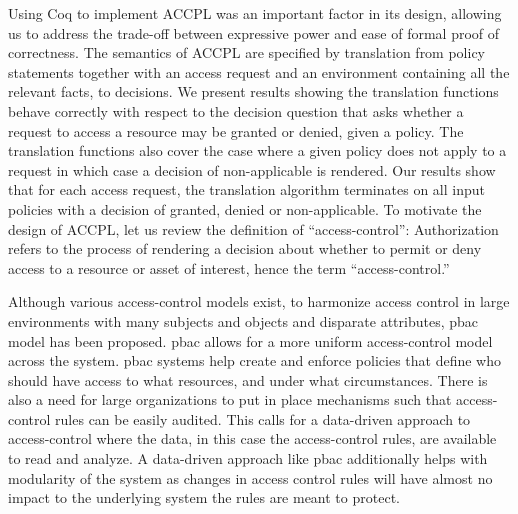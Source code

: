 \documentclass[conference]{IEEEtran}
\begin{document}
Using Coq to implement \ac{ACCPL} was an
important factor in its design, allowing us to address the trade-off
between expressive power and ease of formal proof of correctness.
The semantics of \ac{ACCPL} are specified by translation from policy
statements together with an access request and an environment
containing all the relevant facts, to decisions. We present results
showing the translation functions behave correctly with respect to the
decision question that asks whether a request to access a resource may
be granted or denied, given a policy. The translation functions also
cover the case where a given policy does not apply to a request in
which case a decision of non-applicable is rendered. Our results show
that for each access request, the translation algorithm terminates on
all input policies with a decision of granted, denied or
non-applicable.
To motivate the design of \ac{ACCPL}, let us review the definition of
``access-control'': Authorization refers to the process of rendering a
decision about whether to permit or deny access to a resource or asset
of interest, hence the term ``access-control.''

Although various access-control models exist, to 
harmonize access control in large environments with many subjects and objects and disparate attributes, \ac{pbac}~\cite{nist} model has been proposed. \ac{pbac} allows for a more uniform access-control model across the system. \ac{pbac} systems help create and enforce policies
that define who should have access to what resources, and under what circumstances.
There is also a need for large organizations to put in place mechanisms such that access-control rules can be easily audited. This calls for a data-driven approach to access-control where the data, in this case the access-control rules, are available to read and analyze. A data-driven approach like \ac{pbac} additionally helps with modularity of the system as changes in access control rules will have almost no impact to the underlying system the rules are meant to protect.
\end{document}
